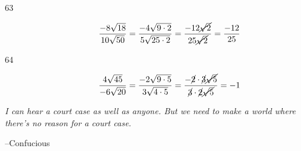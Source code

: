 \documentclass[fleqn,addpoints]{exam}
\begin{document}
\begin{description}
\item[63]
\[
  \frac{-8 \sqrt{18}}{10 \sqrt{50}} = \frac{-4 \sqrt{9 \cdot 2}}{5 \sqrt{25 \cdot 2}}
  = \frac{-12 \cancel{\sqrt{2}}}{25 \cancel{\sqrt{2}}} = \frac{-12}{25}
\]

\item[64]
\[
  \frac{4 \sqrt{45}}{-6 \sqrt{20}} = \frac{-2 \sqrt{9 \cdot 5}}{3 \sqrt{4 \cdot 5}}
  = \frac{- \cancel{2} \cdot \cancel{3} \cancel{\sqrt{5}}}{\cancel{3} \cdot \cancel{2} \cancel{\sqrt{5}}}
  = -1
\]

\end{description}

\else
\vspace{9 cm}

{\em I can hear a court case as well as anyone.  But we need to make a world where there's no reason for a court case.}
\vspace{0.1 in}

\hspace{0.5 in} --Confucious

\fi
\end{document}
